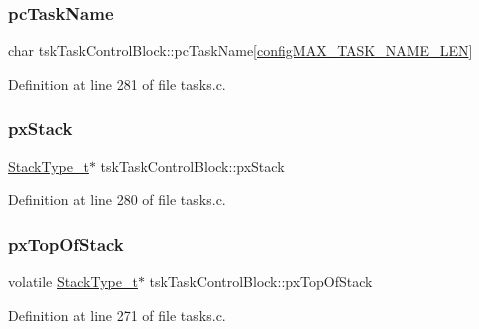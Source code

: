 \subsubsection{\texorpdfstring{pc\+Task\+Name}{pcTaskName}}
{\footnotesize\ttfamily char tsk\+Task\+Control\+Block\+::pc\+Task\+Name\mbox{[}\hyperlink{_free_r_t_o_s_config_8h_ac388dc4041aab6997348828eb27fc1a8}{config\+M\+A\+X\+\_\+\+T\+A\+S\+K\+\_\+\+N\+A\+M\+E\+\_\+\+L\+EN}\mbox{]}}



Definition at line 281 of file tasks.\+c.

\mbox{\label{structtsk_task_control_block_a9a0d71a9f95dd0609f9911d9efd79134}} 
\subsubsection{\texorpdfstring{px\+Stack}{pxStack}}
{\footnotesize\ttfamily \hyperlink{portmacro_8h_a84e9a8ba132feed0b2401c1f4e2ac63c}{Stack\+Type\+\_\+t}$\ast$ tsk\+Task\+Control\+Block\+::px\+Stack}



Definition at line 280 of file tasks.\+c.

\mbox{\label{structtsk_task_control_block_a429a186c7f8e34aba1eef5e12d215b90}} 
\subsubsection{\texorpdfstring{px\+Top\+Of\+Stack}{pxTopOfStack}}
{\footnotesize\ttfamily volatile \hyperlink{portmacro_8h_a84e9a8ba132feed0b2401c1f4e2ac63c}{Stack\+Type\+\_\+t}$\ast$ tsk\+Task\+Control\+Block\+::px\+Top\+Of\+Stack}



Definition at line 271 of file tasks.\+c.

\mbox{\label{structtsk_task_control_block_a79187811e3d2a15595942e3b44237d85}} 

